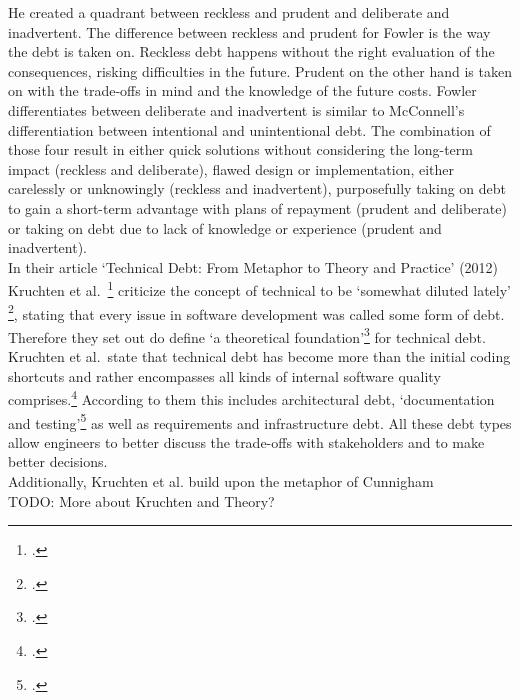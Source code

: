 He created a quadrant between reckless and prudent and deliberate and inadvertent. The difference between reckless and prudent for Fowler is the way the debt is taken on. Reckless debt happens without the right evaluation of the consequences, risking difficulties in the future. Prudent on the other hand is taken on
with the trade-offs in mind and the knowledge of the future costs. Fowler differentiates between deliberate and inadvertent is similar to McConnell's differentiation between intentional and unintentional debt.
The combination of those four result in either quick solutions without considering the long-term impact (reckless and deliberate), flawed design or implementation, either carelessly or unknowingly (reckless and inadvertent), 
purposefully taking on debt to gain a short-term advantage with plans of repayment (prudent and deliberate) or taking on debt due to lack of knowledge or experience (prudent and inadvertent).\\

In their article `Technical Debt: From Metaphor to Theory and Practice' (2012) Kruchten et al.\ \footcite{kruchtenTechnicalDebtMetaphor2012} criticize the concept of technical to be `somewhat diluted lately' \footcite[18]{kruchtenTechnicalDebtMetaphor2012}, stating that every issue in software development was called some form of debt. 
Therefore they set out do define `a theoretical foundation'\footcite[19]{kruchtenTechnicalDebtMetaphor2012} for technical debt.\\
Kruchten et al.\ state that technical debt has become more than the initial coding shortcuts and rather encompasses all kinds of internal software quality comprises.\footcite[19]{kruchtenTechnicalDebtMetaphor2012}
According to them this includes architectural debt, `documentation and testing'\footcite[20]{kruchtenTechnicalDebtMetaphor2012} as well as requirements and infrastructure debt.
All these debt types allow engineers to better discuss the trade-offs with stakeholders and to make better decisions.\\
Additionally, Kruchten et al. build upon the metaphor of Cunnigham 
\\TODO: More about Kruchten and Theory?

